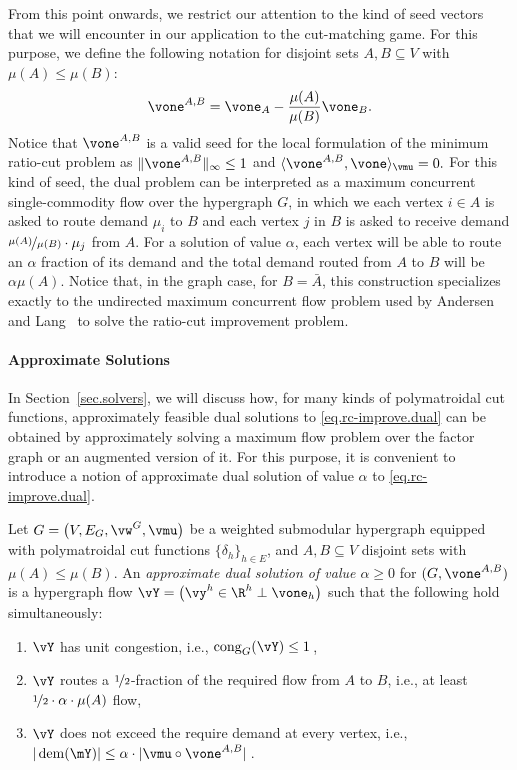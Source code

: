 \documentclass[letterpaper]{article}
\newcommand{\dem}{\operatorname{dem}}
\renewcommand{\cong}{\operatorname{cong}}
\begin{document}
From this point onwards, we restrict our attention to the kind of seed vectors that we will encounter in our application to the cut-matching game. For this purpose, we define the following notation for disjoint sets $A, B \subseteq V$ with $\mu(A) \leq \mu(B)$:
$$
\vone^{A,B} = \vone_A - \frac{\mu(A)}{\mu(B)} \vone_B.
$$
Notice that $\vone^{A,B}$ is a valid seed for the local formulation of the minimum ratio-cut problem as $\|\vone^{A,B}\|_\infty \leq 1$ and $\langle \vone^{A,B} , \vone \rangle_{\vmu} = 0.$
For this kind of seed, the dual problem can be interpreted as a maximum concurrent single-commodity flow over the hypergraph $G$, in which we each vertex $i \in A$ is asked to route demand $\mu_i$ to $B$ and each vertex $j$ in $B$ is asked to receive demand $\nicefrac{\mu(A)}{\mu(B)} \cdot \mu_j$ from $A$. For a solution of value $\alpha$, each vertex will be able to route an $\alpha$ fraction of its demand and the total demand routed from $A$ to $B$ will be $\alpha \mu(A).$
Notice that, in the graph case, for $B = \bar{A}$, this construction specializes exactly to the undirected maximum concurrent flow problem used by Andersen and Lang~\cite{Andersen-Lang} to solve the ratio-cut improvement problem.


\paragraph{Approximate Solutions}
In Section~\ref{sec.solvers}, we will discuss how, for many kinds of polymatroidal cut functions, approximately feasible dual solutions to \eqref{eq.rc-improve.dual} can be obtained by approximately solving a maximum flow problem over the factor graph or an augmented version of it.
For this purpose, it is convenient to introduce a notion of approximate dual solution of value $\alpha$ to \eqref{eq.rc-improve.dual}.

\begin{definition}
\label{def.approximate-primal-dual-solution}
Let $G = \big( V, E_G, \vw^G, \vmu \big)$ be a weighted submodular hypergraph equipped with polymatroidal cut functions $\{\delta_h\}_{h\in E}$, and $A,B \subseteq V$ disjoint sets with $\mu(A) \leq \mu(B)$. An \emph{approximate dual solution of value $\alpha \geq 0$} for $(G,\vone^{A,B})$ is a hypergraph flow $\vY = \big(\vy^h \in \R^h \perp \vone_h\big)$
such that the following hold simultaneously:
\begin{enumerate}
\item $\vY$ has unit congestion, i.e., $\cong_G(\vY) \leq 1$\,,
\item $\vY$ routes a $\nicefrac{1}{2}$-fraction of the required flow from $A$ to $B$, i.e., at least $\nicefrac{1}{2} \cdot \alpha \cdot \mu(A) $  flow,
\item $\vY$ does not exceed the require demand at every vertex, i.e., $|\dem (\mY)| \leq \alpha \cdot |\vmu \circ \vone^{A,B}|$\,.
\end{enumerate}
\end{definition}
\end{document}
